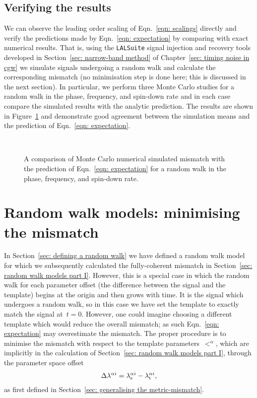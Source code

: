 \documentclass[../full_thesis/full_thesis.tex]{subfiles}
\begin{document}
\subsection{Verifying the results}
\label{sec: verifying}

We can observe the leading order scaling of Eqn.~\eqref{eqn: scalings} directly
and verify the predictions made by Eqn.~\eqref{eqn: expectation} by comparing
with exact numerical results. That is, using the \verb+LALSuite+
\cite{lalsuite}  signal injection and recovery tools developed in
Section~\ref{sec: narrow-band method} of Chapter~\ref{sec: timing noise in
cgw} we simulate signals undergoing a random walk and calculate the
corresponding mismatch (no minimisation step is done here; this is discussed in
the next section). In particular, we perform three Monte Carlo studies for a
random walk in the phase, frequency, and spin-down rate and in each case
compare the simulated results with the analytic prediction. The results are
shown in Figure~\ref{fig: rw I} and demonstrate good agreement between the
simulation means and the prediction of Eqn.~\eqref{eqn: expectation}.

\begin{figure}[ht]
\centering
{}
\\ 
\caption{A comparison of Monte Carlo numerical simulated mismatch with the prediction
of Eqn.~\eqref{eqn: expectation} for a random walk in the phase, frequency,
and spin-down rate.}
\label{fig: rw I}
\end{figure}

\section{Random walk models: minimising the mismatch}
\label{sec: random walk models part II}
In Section~\ref{sec: defining a random walk} we have defined a random walk
model for which we subsequently calculated the fully-coherent mismatch in
Section~\ref{sec: random walk models part I}. However, this is a special case
in which the random walk for each parameter offset (the difference between the
signal and the template) begins at the origin and then grows with time. It is
the signal which undergoes a random walk, so in this case we have set the
template to exactly match the signal at~$t=0$. However, one could imagine choosing
a different template which would reduce the overall mismatch; as such
Eqn.~\eqref{eqn: expectation} may overestimate the mismatch. The proper procedure
is to minimise the mismatch with respect to the
template parameters~$\lt^{\alpha}$, which are implicitly in the calculation of
Section~\ref{sec: random walk models part I}, through the parameter space
offset
\begin{align}
\Delta \lambda^{\alpha i} = {\lambda}_\textrm{s}^{\alpha i} - {\lambda}_\textrm{t}^{\alpha i},
\end{align}
as first defined in Section~\ref{sec: generalising the metric-mismatch}.
\end{document}
